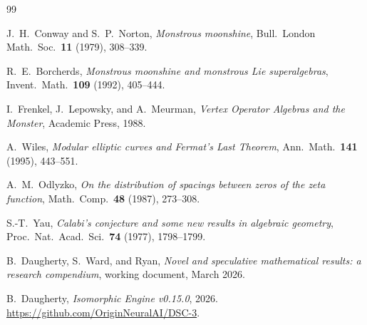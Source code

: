 \documentclass[11pt]{amsart}
\theoremstyle{definition}
\begin{document}
\begin{thebibliography}{99}

J.~H.~Conway and S.~P.~Norton, \emph{Monstrous moonshine}, Bull.\ London Math.\ Soc.\ \textbf{11} (1979), 308--339.

R.~E.~Borcherds, \emph{Monstrous moonshine and monstrous Lie superalgebras}, Invent.\ Math.\ \textbf{109} (1992), 405--444.

I.~Frenkel, J.~Lepowsky, and A.~Meurman, \emph{Vertex Operator Algebras and the Monster}, Academic Press, 1988.

A.~Wiles, \emph{Modular elliptic curves and Fermat's Last Theorem}, Ann.\ Math.\ \textbf{141} (1995), 443--551.

A.~M.~Odlyzko, \emph{On the distribution of spacings between zeros of the zeta function}, Math.\ Comp.\ \textbf{48} (1987), 273--308.

S.-T.~Yau, \emph{Calabi's conjecture and some new results in algebraic geometry}, Proc.\ Nat.\ Acad.\ Sci.\ \textbf{74} (1977), 1798--1799.

B.~Daugherty, S.~Ward, and Ryan, \emph{Novel and speculative mathematical results: a research compendium}, working document, March 2026.

B.~Daugherty, \emph{Isomorphic Engine v0.15.0}, 2026. \url{https://github.com/OriginNeuralAI/DSC-3}.

\end{thebibliography}
\end{document}
